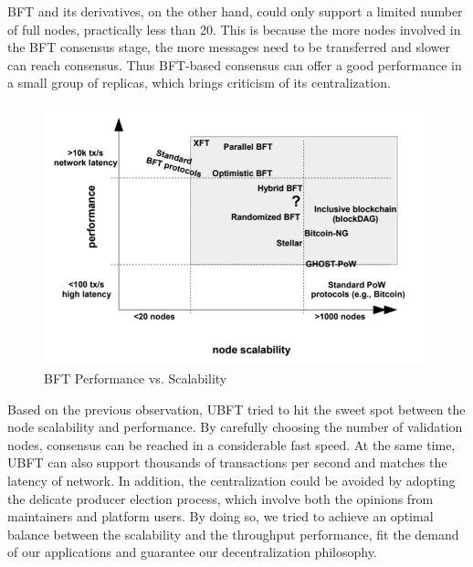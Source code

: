 BFT and its derivatives, on the other hand, could only support a limited number of full nodes, practically less than 20. This is because the more nodes involved in the BFT consensus stage, the more messages need to be transferred and slower can reach consensus. Thus BFT-based consensus can offer a good performance in a small group of replicas, which brings criticism of its centralization.

\begin{figure}
\centering
\includegraphics[width=  \linewidth]{bft_perf.png}
\caption{BFT Performance vs. Scalability}
\label{fig:bft_perf}
\end{figure}   

Based on the previous observation, UBFT tried to hit the sweet spot between the node scalability and performance. By carefully choosing the number of validation nodes, consensus can be reached in a considerable fast speed. At the same time, UBFT can also support thousands of transactions per second and matches the latency of network. In addition, the centralization could be avoided by adopting the delicate producer election process, which involve both the opinions from maintainers and platform users. By doing so, we tried to achieve an optimal balance between the scalability and the throughput performance, fit the demand of our applications and guarantee our decentralization philosophy.



